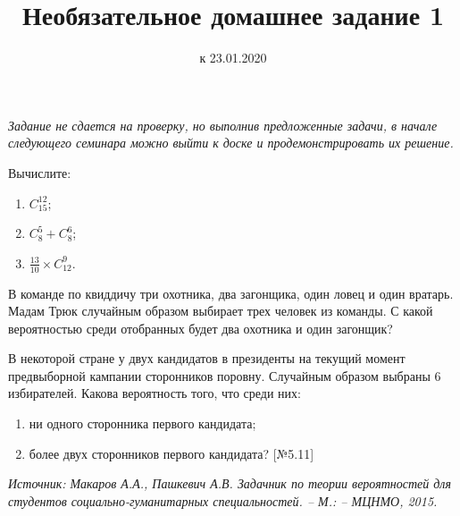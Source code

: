 \documentclass[a4paper, 12pt]{article}
\title{Необязательное домашнее задание 1}
\date{к 23.01.2020}
\begin{document}
\noindent\textit{Задание не сдается на проверку, но выполнив предложенные задачи, в начале 
следующего семинара можно выйти к доске и продемонстрировать их решение.}

\begin{problem}
Вычислите:
\begin{enumerate}
\item $C_{15}^{12}$;
\item $C_8^5 + C_8^6$;
\item $\frac{13}{10}\times C_{12}^9$.
\end{enumerate}
\end{problem}

\begin{problem}
В команде по квиддичу три охотника, два загонщика, 
один ловец и один вратарь. Мадам Трюк случайным образом выбирает
трех человек из команды. С какой вероятностью среди отобранных 
будет два охотника и один загонщик? 
\end{problem}


\begin{problem}
В некоторой стране у двух кандидатов в президенты на 
текущий момент предвыборной кампании сторонников поровну. 
Случайным образом выбраны $6$ избирателей. Какова вероятность 
того, что среди них:
\begin{enumerate}
\item ни одного сторонника первого кандидата; 
\item более двух сторонников первого кандидата? [№5.11]
\end{enumerate}
\end{problem}

\noindent\textit{Источник: Макаров А.А., Пашкевич А.В. Задачник по теории вероятностей для 
студентов социально-гуманитарных специальностей. -- М.: -- МЦНМО, 2015.}
\end{document}

